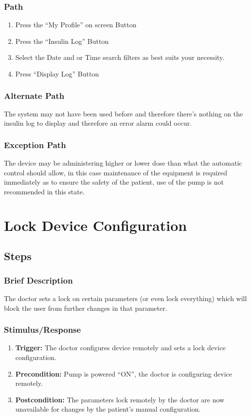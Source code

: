 \documentclass{scrreprt}
\begin{document}
    \subsubsection{Path}
    \begin{enumerate}
        \item Press the “My Profile” on screen Button
        \item Press the “Insulin Log” Button
        \item Select the Date and or Time search filters as best suits your necessity.
        \item Press “Display Log” Button
    \end{enumerate}
    \subsubsection{Alternate Path}
        The system may not have been used before and therefore there’s nothing on the insulin log to display and therefore an error alarm could occur.
    \subsubsection{Exception Path}
        The device may be administering higher or lower dose than what the automatic control should allow, in this case maintenance of the equipment is required immediately as to ensure the safety of the patient, use of 
        the pump is not recommended in this state.

\section{Lock Device Configuration}
\subsection{Steps}
    \subsubsection{Brief Description}
        The doctor sets a lock on certain parameters (or even lock everything) which will block the user from further changes in that parameter.
    \subsubsection{Stimulus/Response}
    \begin{enumerate}
        \item \textbf{Trigger:} The doctor configures device remotely and sets a lock device configuration.
        \item \textbf{Precondition:} Pump is powered “ON”, the doctor is configuring device remotely.
        \item \textbf{Postcondition:} The parameters lock remotely by the doctor are now unavailable for changes by the patient’s manual configuration.
    \end{enumerate}
\end{document}
